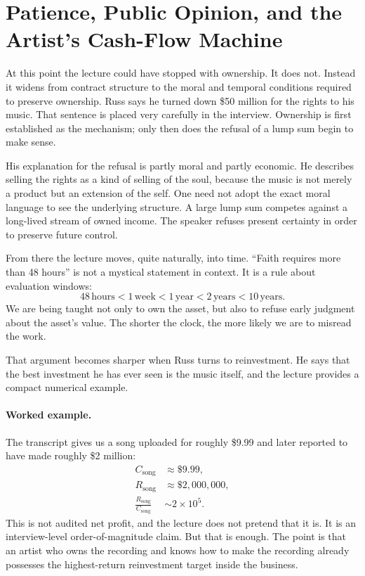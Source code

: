 \section{Patience, Public Opinion, and the Artist's Cash-Flow Machine}

At this point the lecture could have stopped with ownership. It does not. Instead it widens from contract structure to the moral and temporal conditions required to preserve ownership. Russ says he turned down \$50 million for the rights to his music. That sentence is placed very carefully in the interview. Ownership is first established as the mechanism; only then does the refusal of a lump sum begin to make sense.

His explanation for the refusal is partly moral and partly economic. He describes selling the rights as a kind of selling of the soul, because the music is not merely a product but an extension of the self. One need not adopt the exact moral language to see the underlying structure. A large lump sum competes against a long-lived stream of owned income. The speaker refuses present certainty in order to preserve future control.

From there the lecture moves, quite naturally, into time. ``Faith requires more than 48 hours'' is not a mystical statement in context. It is a rule about evaluation windows:
\begin{equation}
48\,\mathrm{hours}<1\,\mathrm{week}<1\,\mathrm{year}<2\,\mathrm{years}<10\,\mathrm{years}.
\end{equation}
We are being taught not only to own the asset, but also to refuse early judgment about the asset's value. The shorter the clock, the more likely we are to misread the work.

That argument becomes sharper when Russ turns to reinvestment. He says that the best investment he has ever seen is the music itself, and the lecture provides a compact numerical example.

\paragraph{Worked example.} The transcript gives us a song uploaded for roughly \$9.99 and later reported to have made roughly \$2 million:
\begin{align}
C_{\mathrm{song}} &\approx \$9.99,\\
R_{\mathrm{song}} &\approx \$2{,}000{,}000,\\
\frac{R_{\mathrm{song}}}{C_{\mathrm{song}}} &\sim 2\times 10^5.
\end{align}
This is not audited net profit, and the lecture does not pretend that it is. It is an interview-level order-of-magnitude claim. But that is enough. The point is that an artist who owns the recording and knows how to make the recording already possesses the highest-return reinvestment target inside the business.

